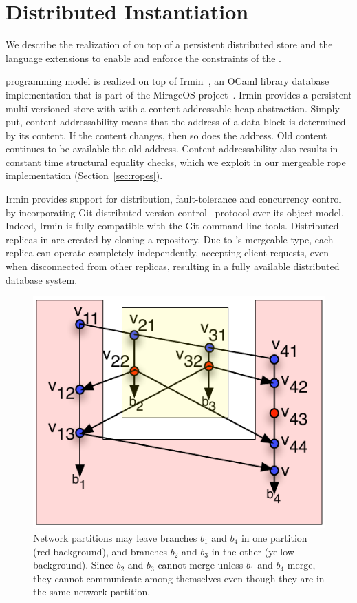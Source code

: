 \section{Distributed Instantiation}
\label{sec:implementation}

We describe the realization of \name on top of a persistent
distributed store and the language extensions to enable and enforce
the constraints of the \name.

\name programming model is realized on top of Irmin~\cite{irmin}, an OCaml
library database implementation that is part of the MirageOS
project~\cite{mirage}. Irmin provides a persistent multi-versioned store with
with a content-addressable heap abstraction. Simply put, content-addressability
means that the address of a data block is determined by its content. If the
content changes, then so does the address. Old content continues to be
available the old address. Content-addressability also results in constant time
structural equality checks, which we exploit in our mergeable rope
implementation (Section~\ref{sec:ropes}).

Irmin provides support for distribution, fault-tolerance and concurrency
control by incorporating Git distributed version control~\cite{git} protocol
over its object model. Indeed, Irmin is fully compatible with the Git command
line tools. Distributed replicas in \name are created by cloning a \name
repository. Due to \name's mergeable type, each replica can operate completely
independently, accepting client requests, even when disconnected from other
replicas, resulting in a fully available distributed database system.

\begin{figure}
	\begin{center}
	\includegraphics[scale=0.8]{Figures/partitions}
	\end{center}
	\caption{Network partitions may leave branches $b_1$ and $b_4$ in one
		partition (red background), and branches $b_2$ and $b_3$ in the other
		(yellow background). Since $b_2$ and $b_3$ cannot merge unless $b_1$ and
		$b_4$ merge, they cannot communicate among themselves even though they are in
		the same network partition.}
	\label{fig:partitions}
\end{figure}

